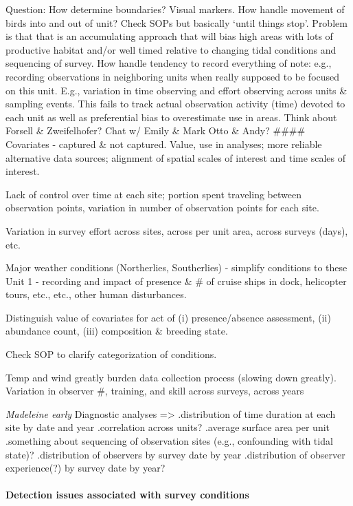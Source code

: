 \documentclass[]{article}
\let\oldparagraph\paragraph
\renewcommand{\paragraph}[1]{\oldparagraph{#1}\mbox{}}
\begin{document}
Question: How determine boundaries? Visual markers. How handle movement
of birds into and out of unit? Check SOPs but basically `until things
stop'. Problem is that that is an accumulating approach that will bias
high areas with lots of productive habitat and/or well timed relative to
changing tidal conditions and sequencing of survey. How handle tendency
to record everything of note: e.g., recording observations in
neighboring units when really supposed to be focused on this unit. E.g.,
variation in time observing and effort observing across units \&
sampling events. This fails to track actual observation activity (time)
devoted to each unit as well as preferential bias to overestimate use in
areas. Think about Forsell \& Zweifelhofer? Chat w/ Emily \& Mark Otto
\& Andy? \#\#\#\# Covariates - captured \& not captured. Value, use in
analyses; more reliable alternative data sources; alignment of spatial
scales of interest and time scales of interest.

Lack of control over time at each site; portion spent traveling between
observation points, variation in number of observation points for each
site.

Variation in survey effort across sites, across per unit area, across
surveys (days), etc.

Major weather conditions (Northerlies, Southerlies) - simplify
conditions to these Unit 1 - recording and impact of presence \& \# of
cruise ships in dock, helicopter tours, etc., etc., other human
disturbances.

Distinguish value of covariates for act of (i) presence/absence
assessment, (ii) abundance count, (iii) composition \& breeding state.

Check SOP to clarify categorization of conditions.

Temp and wind greatly burden data collection process (slowing down
greatly). Variation in observer \#, training, and skill across surveys,
across years

\emph{Madeleine early} Diagnostic analyses =\textgreater{} .distribution
of time duration at each site by date and year .correlation across
units? .average surface area per unit .something about sequencing of
observation sites (e.g., confounding with tidal state)? .distribution of
observers by survey date by year .distribution of observer experience(?)
by survey date by year?

\paragraph{Detection issues associated with survey
conditions}\label{detection-issues-associated-with-survey-conditions}
\end{document}
